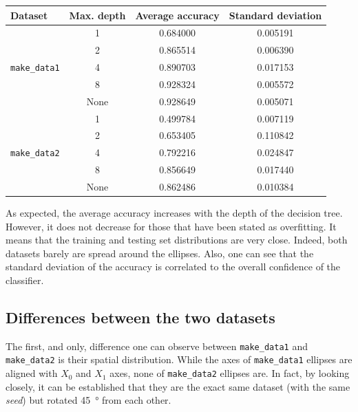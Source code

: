 \documentclass[a4paper, 12pt]{article}
\begin{document}
    \begin{table}[h]
        \centering
        \begin{tabular}{|l|c|c|c|}
            \hline 
            Dataset & Max. depth & Average accuracy & Standard deviation \\ \hline\hline
            \multirow{5}{*}{\texttt{make\_data1}} & 1 & \num{0.684000} & \num{0.005191} \\
            & 2 & \num{0.865514} & \num{0.006390} \\
            & 4 & \num{0.890703} & \num{0.017153} \\
            & 8 & \num{0.928324} & \num{0.005572} \\
            & None & \num{0.928649} & \num{0.005071} \\ \hline
            \multirow{5}{*}{\texttt{make\_data2}} & 1 & \num{0.499784} & \num{0.007119} \\
            & 2 & \num{0.653405} & \num{0.110842} \\
            & 4 & \num{0.792216} & \num{0.024847} \\
            & 8 & \num{0.856649} & \num{0.017440} \\
            & None & \num{0.862486} & \num{0.010384} \\ \hline
        \end{tabular}
        \label{tab:accuracies_decision_tree}
    \end{table}
    
    As expected, the average accuracy increases with the depth of the decision tree. However, it does not decrease for those that have been stated as overfitting. It means that the training and testing set distributions are very close. Indeed, both datasets barely are spread around the ellipses. Also, one can see that the standard deviation of the accuracy is correlated to the overall confidence of the classifier.
   
    \subsection{Differences between the two datasets}\label{sec:difference}
    
    The first, and only, difference one can observe between \texttt{make\_data1} and \texttt{make\_data2} is their spatial distribution. While the axes of \texttt{make\_data1} ellipses are aligned with $X_0$ and $X_1$ axes, none of \texttt{make\_data2} ellipses are. In fact, by looking closely, it can be established that they are the exact same dataset (with the same \emph{seed}) but rotated \SI{45}{\degree} from each other.
    
\end{document}
